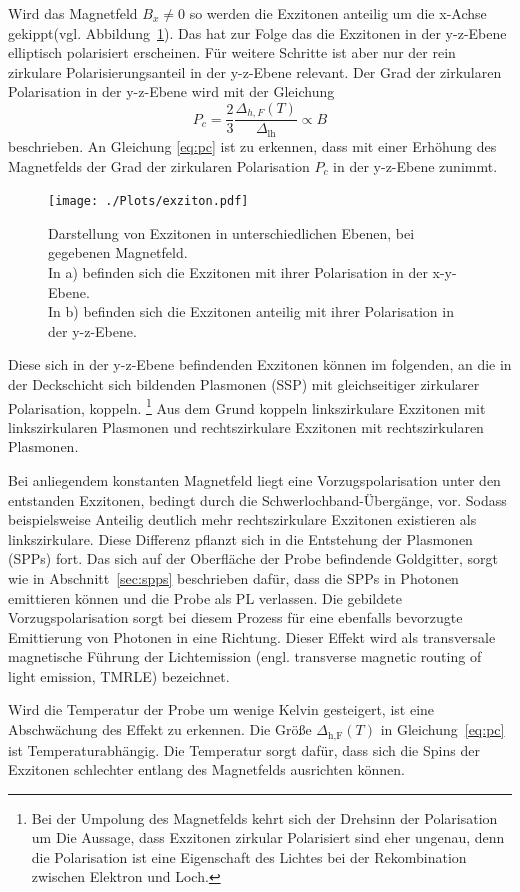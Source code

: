 
Wird das Magnetfeld $B_{x} \neq 0 $ so werden die Exzitonen anteilig um die x-Achse gekippt(vgl. Abbildung~\ref{fig:exziton}).
Das hat zur Folge das die Exzitonen in der y-z-Ebene elliptisch polarisiert erscheinen. 
Für weitere Schritte ist aber nur der rein zirkulare Polarisierungsanteil in der y-z-Ebene relevant.
Der Grad der zirkularen Polarisation in der y-z-Ebene wird mit der Gleichung
\begin{equation}
    P_c = \frac{2}{3} \frac{\Delta_{h,F}(T)}{\Delta_\text{lh}} \propto B
    \label{eq:pc}
\end{equation}  %
beschrieben.
An Gleichung \ref{eq:pc} ist zu erkennen, dass mit einer Erhöhung des Magnetfelds der Grad der zirkularen Polarisation $P_{c}$
in der y-z-Ebene zunimmt.
\begin{figure}
    \centering
    \texttt{[image: ./Plots/exziton.pdf]}
    \caption{Darstellung von Exzitonen in unterschiedlichen Ebenen, bei gegebenen Magnetfeld.\\
    In a) befinden sich die Exzitonen mit ihrer Polarisation in der x-y-Ebene.\\
    In b) befinden sich die Exzitonen anteilig mit ihrer Polarisation in der y-z-Ebene.\cite{lars}}
    \label{fig:exziton}
\end{figure}
\FloatBarrier

Diese sich in der y-z-Ebene befindenden Exzitonen können im folgenden, an die in der Deckschicht sich bildenden 
Plasmonen (SSP) mit gleichseitiger zirkularer Polarisation, koppeln.
\footnote{Bei der Umpolung des Magnetfelds kehrt sich der Drehsinn der Polarisation um  
Die Aussage, dass Exzitonen zirkular Polarisiert sind eher ungenau, denn die Polarisation
ist eine Eigenschaft des Lichtes bei der Rekombination zwischen Elektron und Loch.}
Aus dem Grund koppeln linkszirkulare Exzitonen mit linkszirkularen Plasmonen und 
rechtszirkulare Exzitonen mit rechtszirkularen Plasmonen.

Bei anliegendem konstanten Magnetfeld liegt eine Vorzugspolarisation unter 
den entstanden Exzitonen, bedingt durch die Schwerlochband-Übergänge, vor.
Sodass beispielsweise Anteilig deutlich mehr rechtszirkulare Exzitonen existieren
als linkszirkulare. 
Diese Differenz pflanzt sich in die Entstehung der Plasmonen (SPPs) fort.
Das sich auf der Oberfläche der Probe befindende Goldgitter, sorgt wie in Abschnitt~\ref{sec:spps}
beschrieben dafür, dass die SPPs in Photonen emittieren können und die Probe als PL verlassen.
Die gebildete Vorzugspolarisation sorgt bei diesem Prozess für eine ebenfalls bevorzugte Emittierung von Photonen
in eine Richtung. 
Dieser Effekt wird als transversale magnetische Führung der Lichtemission 
(engl. transverse magnetic routing of light emission, TMRLE) bezeichnet.

Wird die Temperatur der Probe um wenige Kelvin gesteigert, ist eine Abschwächung des Effekt zu erkennen.
Die Größe $\Delta_\text{h,F}(T)$ in Gleichung~\ref{eq:pc} ist Temperaturabhängig. 
Die Temperatur sorgt dafür, dass sich die Spins der Exzitonen schlechter entlang
des Magnetfelds ausrichten können.\cite{felix}